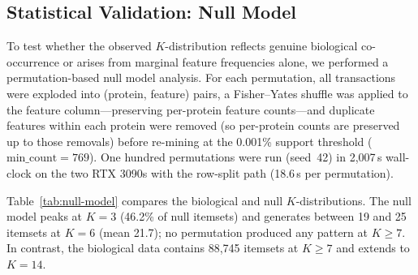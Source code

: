 \documentclass[10pt,a4paper,twocolumn]{article}
\begin{document}
\subsection{Statistical Validation: Null Model}
\label{sec:null-model}

To test whether the observed $K$-distribution reflects genuine biological co-occurrence or arises from marginal feature frequencies alone, we performed a permutation-based null model analysis. For each permutation, all transactions were exploded into (protein, feature) pairs, a Fisher--Yates shuffle was applied to the feature column---preserving per-protein feature counts---and duplicate features within each protein were removed (so per-protein counts are preserved up to those removals) before re-mining at the 0.001\% support threshold ($\text{min\_count}{=}769$). One hundred permutations were run (seed~42) in 2,007\,s wall-clock on the two RTX 3090s with the row-split path (18.6\,s per permutation).

Table~\ref{tab:null-model} compares the biological and null $K$-distributions. The null model peaks at $K{=}3$ (46.2\% of null itemsets) and generates between 19 and 25 itemsets at $K{=}6$ (mean 21.7); no permutation produced any pattern at $K{\geq}7$. In contrast, the biological data contains 88,745 itemsets at $K{\geq}7$ and extends to $K{=}14$.

\begin{table}[t]
\caption{Biological vs.\ null model $K$-distributions at 0.001\% support (100 permutations, seed 42). $Z=(\text{Bio}-\mu)/\sigma$ with $\mu$ and $\sigma$ estimated from the 100 permutations; because $\sigma$ is tiny relative to the biological excess, the magnitudes indicate strong enrichment rather than calibrated tail probabilities. $p$ is the one-sided empirical permutation $p$-value for enrichment with the $+1$ correction~\cite{phipson2010}, whose resolution with 100 permutations is $1/101{\approx}0.0099$. $K{\geq}7$ patterns are absent from all 100 null runs; the exact one-sided binomial 95\% upper bound on the per-permutation probability of any such pattern is $1-0.05^{1/100}=0.0295$.}
\label{tab:null-model}
\centering
{}
\end{table}
\end{document}
